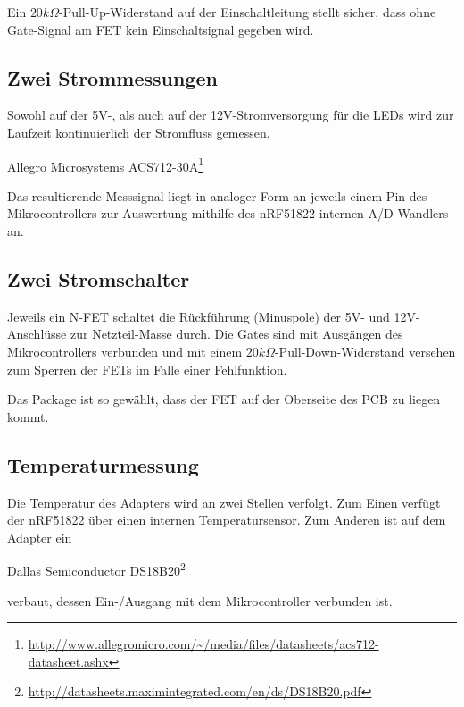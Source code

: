 Ein $20k\Omega$-Pull-Up-Widerstand auf der Einschaltleitung
stellt sicher, dass ohne Gate-Signal am FET
kein Einschaltsignal gegeben wird.

\subsection{Zwei Strommessungen}
Sowohl auf der 5V-,
als auch auf der 12V-Stromversorgung
f\"ur die LEDs
wird zur Laufzeit kontinuierlich
der Stromfluss gemessen.

\begin{center}
Allegro Microsystems ACS712-30A\footnote{\url{http://www.allegromicro.com/~/media/files/datasheets/acs712-datasheet.ashx}}
\end{center}
Das resultierende Messsignal liegt
in analoger Form
an jeweils einem Pin des Mikrocontrollers
zur Auswertung
mithilfe des nRF51822-internen A/D-Wandlers
an.

\subsection{Zwei Stromschalter}
Jeweils ein N-FET schaltet die R\"uckf\"uhrung (Minuspole)
der 5V- und 12V-Anschl\"usse zur Netzteil-Masse durch.
Die Gates sind mit Ausg\"angen des Mikrocontrollers verbunden
und mit einem $20k\Omega$-Pull-Down-Widerstand versehen
zum Sperren der FETs
im Falle einer Fehlfunktion.

Das Package ist so gew\"ahlt,
dass der FET auf der Oberseite des PCB
zu liegen kommt.

\subsection{Temperaturmessung}
Die Temperatur des Adapters wird an zwei Stellen verfolgt.
Zum Einen verf\"ugt der nRF51822 \"uber einen internen Temperatursensor.
Zum Anderen ist auf dem Adapter ein
\begin{center}
	Dallas Semiconductor DS18B20\footnote{\url{http://datasheets.maximintegrated.com/en/ds/DS18B20.pdf}}
\end{center}
verbaut,
dessen Ein-/Ausgang
mit dem Mikrocontroller verbunden ist.

